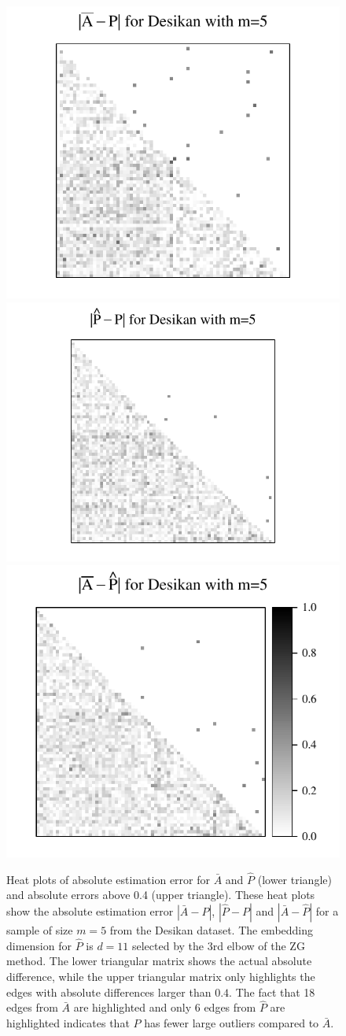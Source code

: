 \begin{figure}
\begin{center}
  \includegraphics[height=.315\linewidth]{./Figures/Diff2_desikan_m5.pdf}\hspace{-40pt}
  \includegraphics[height=.32\linewidth]{./Figures/Diff3_desikan_m5.pdf}\hspace{-34pt}
  \includegraphics[height=.32\linewidth]{./Figures/Diff1_desikan_m5.pdf}
\end{center}
\caption[Heat plots of absolute estimation error for both estimators]{Heat plots of absolute estimation error for $\bar{A}$ and $\hat{P}$ (lower triangle) and absolute errors above 0.4 (upper triangle).
These heat plots show the absolute estimation error $|\bar{A} - P|$, $|\hat{P} - P|$ and $|\bar{A} - \hat{P}|$ for a sample of size $m=5$ from the Desikan dataset.
The embedding dimension for $\hat{P}$ is $d=11$ selected by the 3rd elbow of the ZG method. The lower triangular matrix shows the actual absolute difference, while the upper triangular matrix only highlights the edges with absolute differences larger than $0.4$. The fact that 18 edges from $\bar{A}$ are highlighted and only 6 edges from $\hat{P}$ are highlighted indicates that $\hat{P}$ has fewer large outliers compared to $\bar{A}$.
}
\label{fig:Diff_desikan_m5}
\end{figure}

